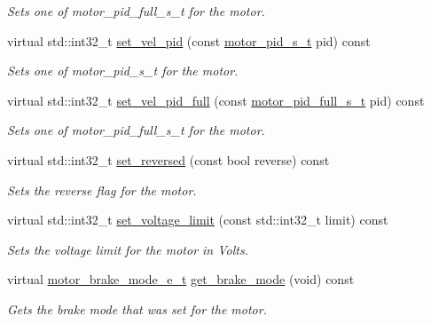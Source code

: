 \begin{DoxyCompactItemize}
\begin{DoxyCompactList}\small\item\em Sets one of motor\+\_\+pid\+\_\+full\+\_\+s\+\_\+t for the motor. \end{DoxyCompactList}\item 
virtual std\+::int32\+\_\+t \mbox{\hyperlink{classpros_1_1Motor_a69169ae0cd2b7f68ee533648c7830397}{set\+\_\+vel\+\_\+pid}} (const \mbox{\hyperlink{motors_8h_ad2e907c8d7ce53c1fd91f1b9801072e3}{motor\+\_\+pid\+\_\+s\+\_\+t}} pid) const
\begin{DoxyCompactList}\small\item\em Sets one of motor\+\_\+pid\+\_\+s\+\_\+t for the motor. \end{DoxyCompactList}\item 
virtual std\+::int32\+\_\+t \mbox{\hyperlink{classpros_1_1Motor_a7fc8eefc04c8b8aaefad75437b49f30a}{set\+\_\+vel\+\_\+pid\+\_\+full}} (const \mbox{\hyperlink{motors_8h_a0295cbf49f5c70c17b5fa962bd25febd}{motor\+\_\+pid\+\_\+full\+\_\+s\+\_\+t}} pid) const
\begin{DoxyCompactList}\small\item\em Sets one of motor\+\_\+pid\+\_\+full\+\_\+s\+\_\+t for the motor. \end{DoxyCompactList}\item 
virtual std\+::int32\+\_\+t \mbox{\hyperlink{classpros_1_1Motor_a44fcc6447ed1416e880232baa16a221e}{set\+\_\+reversed}} (const bool reverse) const
\begin{DoxyCompactList}\small\item\em Sets the reverse flag for the motor. \end{DoxyCompactList}\item 
virtual std\+::int32\+\_\+t \mbox{\hyperlink{classpros_1_1Motor_a3cd7e4ca0714b533d873796cf8b74a81}{set\+\_\+voltage\+\_\+limit}} (const std\+::int32\+\_\+t limit) const
\begin{DoxyCompactList}\small\item\em Sets the voltage limit for the motor in Volts. \end{DoxyCompactList}\item 
virtual \mbox{\hyperlink{motors_8h_aa324a2881696428c9e3684f9ad23a83b}{motor\+\_\+brake\+\_\+mode\+\_\+e\+\_\+t}} \mbox{\hyperlink{classpros_1_1Motor_acc0c2225d2b713b73e1caee1a483a958}{get\+\_\+brake\+\_\+mode}} (void) const
\begin{DoxyCompactList}\small\item\em Gets the brake mode that was set for the motor. \end{DoxyCompactList}\item 

\end{DoxyCompactItemize}
